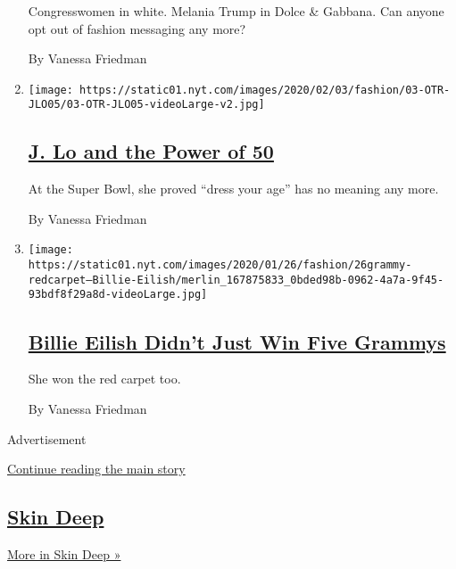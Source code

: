 \begin{enumerate}
  Congresswomen in white. Melania Trump in Dolce \& Gabbana. Can anyone
  opt out of fashion messaging any more?

  By Vanessa Friedman
\item
  \texttt{[image: https://static01.nyt.com/images/2020/02/03/fashion/03-OTR-JLO05/03-OTR-JLO05-videoLarge-v2.jpg]}

  \hypertarget{j-lo-and-the-power-of-50}{%
  \subsection{\texorpdfstring{\href{/2020/02/03/style/jennifer-lopez-super-bowl.html}{J.
  Lo and the Power of
  50}}{J. Lo and the Power of 50}}\label{j-lo-and-the-power-of-50}}

  At the Super Bowl, she proved ``dress your age'' has no meaning any
  more.

  By Vanessa Friedman
\item
  \texttt{[image: https://static01.nyt.com/images/2020/01/26/fashion/26grammy-redcarpet--Billie-Eilish/merlin\_167875833\_0bded98b-0962-4a7a-9f45-93bdf8f29a8d-videoLarge.jpg]}

  \hypertarget{billie-eilish-didnt-just-win-five-grammys}{%
  \subsection{\texorpdfstring{\href{/2020/01/27/fashion/billie-eilish-grammys.html}{Billie
  Eilish Didn't Just Win Five
  Grammys}}{Billie Eilish Didn't Just Win Five Grammys}}\label{billie-eilish-didnt-just-win-five-grammys}}

  She won the red carpet too.

  By Vanessa Friedman
\end{enumerate}

Advertisement

\protect\hyperlink{after-mid5}{Continue reading the main story}

\hypertarget{skin-deep}{%
\subsection{\texorpdfstring{\href{/column/skin-deep}{Skin
Deep}}{Skin Deep}}\label{skin-deep}}

\href{/column/skin-deep}{More in Skin Deep »}

